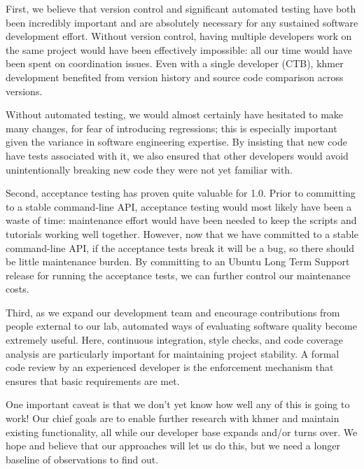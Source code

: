 \documentclass[12pt]{article}
\begin{document}
First, we believe that version control and significant automated
testing have both been incredibly important and are absolutely
necessary for any sustained software development effort.  Without
version control, having multiple developers work on the same project
would have been effectively impossible: all our time would have been
spent on coordination issues.  Even with a single developer (CTB),
khmer development benefited from version history and source code
comparison across versions.

Without automated testing, we would almost certainly have hesitated to
make many changes, for fear of introducing regressions; this is
especially important given the variance in software engineering
expertise.  By insisting that new code have tests associated with it,
we also ensured that other developers would avoid unintentionally breaking
new code they were not yet familiar with.

Second, acceptance testing has proven quite valuable for 1.0.  Prior
to committing to a stable command-line API, acceptance testing would
most likely have been a waste of time: maintenance effort would have
been needed to keep the scripts and tutorials working well together.
However, now that we have committed to a stable command-line API, if
the acceptance tests break it will be a bug, so there should be little
maintenance burden.  By committing to an Ubuntu Long Term Support
release for running the acceptance tests, we can further control our
maintenance costs.

Third, as we expand our development team and encourage contributions
from people external to our lab, automated ways of evaluating software
quality become extremely useful.  Here, continuous integration, style
checks, and code coverage analysis are particularly important for
maintaining project stability.  A formal code review by an experienced
developer is the enforcement mechanism that ensures that basic requirements
are met.

One important caveat is that we don't yet know how well any of this is
going to work!  Our chief goals are to enable further research with
khmer and maintain existing functionality, all while our
developer base expands and/or turns over. We hope and believe that our
approaches will let us do this, but we need a longer baseline of
observations to find out.


\end{document}
